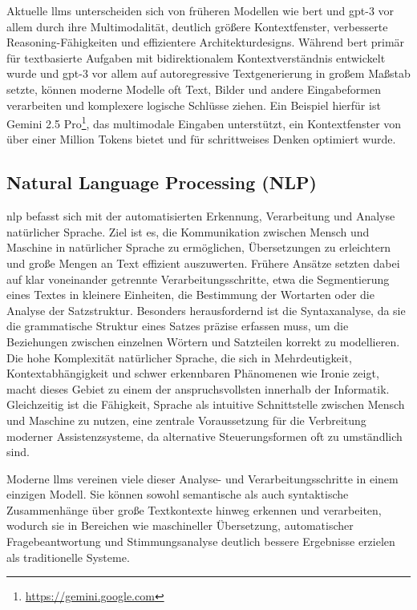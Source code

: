 Aktuelle \glspl{llm} unterscheiden sich von früheren Modellen wie \gls{bert} und \gls{gpt}-3 vor allem durch ihre Multimodalität, deutlich größere Kontextfenster, verbesserte Reasoning-Fähigkeiten und effizientere Architekturdesigns.
Während \gls{bert} primär für textbasierte Aufgaben mit bidirektionalem Kontextverständnis entwickelt wurde und \gls{gpt}-3 vor allem auf autoregressive Textgenerierung in großem Maßstab setzte, können moderne Modelle oft Text, Bilder und andere Eingabeformen verarbeiten und komplexere logische Schlüsse ziehen.
Ein Beispiel hierfür ist Gemini 2.5 Pro\footnote{\url{https://gemini.google.com}}, das multimodale Eingaben unterstützt, ein Kontextfenster von über einer Million Tokens bietet und für schrittweises Denken optimiert wurde.

\subsection{Natural Language Processing (NLP)}

\gls{nlp} befasst sich mit der automatisierten Erkennung, Verarbeitung und Analyse natürlicher Sprache.
Ziel ist es, die Kommunikation zwischen Mensch und Maschine in natürlicher Sprache zu ermöglichen, Übersetzungen zu erleichtern und große Mengen an Text effizient auszuwerten.
Frühere Ansätze setzten dabei auf klar voneinander getrennte Verarbeitungsschritte, etwa die Segmentierung eines Textes in kleinere Einheiten, die Bestimmung der Wortarten oder die Analyse der Satzstruktur.
Besonders herausfordernd ist die Syntaxanalyse, da sie die grammatische Struktur eines Satzes präzise erfassen muss, um die Beziehungen zwischen einzelnen Wörtern und Satzteilen korrekt zu modellieren.
Die hohe Komplexität natürlicher Sprache, die sich in Mehrdeutigkeit, Kontextabhängigkeit und schwer erkennbaren Phänomenen wie Ironie zeigt, macht dieses Gebiet zu einem der anspruchsvollsten innerhalb der Informatik.
Gleichzeitig ist die Fähigkeit, Sprache als intuitive Schnittstelle zwischen Mensch und Maschine zu nutzen, eine zentrale Voraussetzung für die Verbreitung moderner Assistenzsysteme, da alternative Steuerungsformen oft zu umständlich sind\autocite{grigoleit_natural_2019}.

Moderne \glspl{llm} vereinen viele dieser Analyse- und Verarbeitungsschritte in einem einzigen Modell.
Sie können sowohl semantische als auch syntaktische Zusammenhänge über große Textkontexte hinweg erkennen und verarbeiten, wodurch sie in Bereichen wie maschineller Übersetzung, automatischer Fragebeantwortung und Stimmungsanalyse deutlich bessere Ergebnisse erzielen als traditionelle Systeme.

